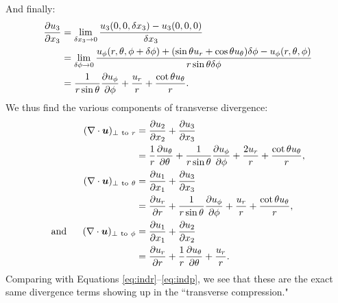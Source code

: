 \documentclass[12pt]{article}
\begin{document}
And finally:
\begin{align}
	\frac{\partial u_3}{\partial x_3} &= \lim_{\delta x_3\rightarrow0}\frac{u_3(0,0,  \delta x_3) - u_3(0,0,0)}{\delta x_3}\nonumber\\
	&=  \lim_{\delta \phi\rightarrow0}  \frac{u_\phi(r, \theta, \phi+\delta\phi) + (\sin\theta u_r + \cos\theta u_\theta)\delta\phi - u_\phi(r,\theta,\phi) } {r\sin\theta\delta\phi}\nonumber\\
	&= \frac{1}{r\sin\theta}\frac{\partial u_\phi}{\partial\phi} + \frac{u_r}{r} + \frac{\cot\theta u_\theta}{r}.
\end{align}
We thus find the various components of transverse divergence: 
\begin{align}
	(\nabla\cdot\bm{u})_{\perp\ \text{to}\ r} &= \frac{\partial u_2}{\partial x_2} + \frac{\partial u_3}{\partial x_3} \nonumber\\
	&= \frac{1}{r} \frac{\partial u_\theta}{\partial\theta}    +    \frac{1}{r\sin\theta} \frac{\partial u_\phi}{\partial\phi}    +    \frac{2u_r}{r}    +     \frac{\cot\theta u_\theta}{r},
	\\
	(\nabla\cdot\bm{u})_{\perp\ \text{to}\ \theta} &= \frac{\partial u_1}{\partial x_1} + \frac{\partial u_3}{\partial x_3} \nonumber\\
	&=  \frac{\partial u_r}{\partial r}    +     \frac{1}{r\sin\theta} \frac{\partial u_\phi}{\partial\phi}    +    \frac{u_r}{r}    +    \frac{\cot\theta u_\theta}{r},
	 \\
	\text{and}\ \ \ \ \  	(\nabla\cdot\bm{u})_{\perp\ \text{to}\ \phi} &= \frac{\partial u_1}{\partial x_1} + \frac{\partial u_2}{\partial x_2} \nonumber\\	
	 &= \frac{\partial u_r}{\partial r}    +     \frac{1}{r} \frac{\partial u_\theta}{\partial\theta}    +    \frac{u_r}{r}.
\end{align}
Comparing with Equations \eqref{eq:indr}--\eqref{eq:indp}, we see that these are the exact same divergence terms showing up in the ``transverse compression." 
\end{document}
